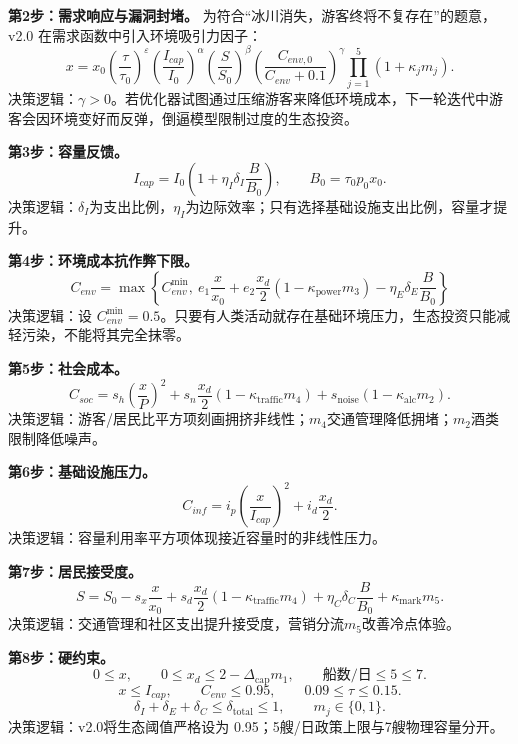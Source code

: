 \documentclass[UTF8,a4paper,12pt]{ctexart}
\begin{document}
\textbf{第2步：需求响应与漏洞封堵。} 为符合“冰川消失，游客终将不复存在”的题意，v2.0 在需求函数中引入环境吸引力因子：
\begin{equation}\tag{M1-2'}
x=x_0\left(\frac{\tau}{\tau_0}\right)^\varepsilon
\left(\frac{I_{cap}}{I_0}\right)^\alpha
\left(\frac{S}{S_0}\right)^\beta
\left(\frac{C_{env,0}}{C_{env} + 0.1}\right)^\gamma
\prod_{j=1}^{5}(1+\kappa_jm_j).
\end{equation}
决策逻辑：\(\gamma>0\)。若优化器试图通过压缩游客来降低环境成本，下一轮迭代中游客会因环境变好而反弹，倒逼模型限制过度的生态投资。

\textbf{第3步：容量反馈。}
\begin{equation}\tag{M1-3}
I_{cap}=I_0\left(1+\eta_I\delta_I\frac{B}{B_0}\right),\qquad B_0=\tau_0p_0x_0.
\end{equation}
决策逻辑：\(\delta_I\)为支出比例，\(\eta_I\)为边际效率；只有选择基础设施支出比例，容量才提升。

\textbf{第4步：环境成本抗作弊下限。}
\begin{equation}\tag{M1-4'}
C_{env} = \max \left\{ C_{env}^{\min}, \ e_1\frac{x}{x_0} + e_2\frac{x_d}{2}(1-\kappa_{\mathrm{power}}m_3) - \eta_E\delta_E\frac{B}{B_0} \right\}
\end{equation}
决策逻辑：设 \(C_{env}^{\min} = 0.5\)。只要有人类活动就存在基础环境压力，生态投资只能减轻污染，不能将其完全抹零。

\textbf{第5步：社会成本。}
\begin{equation}\tag{M1-5}
C_{soc}=s_h\left(\frac{x}{P}\right)^2
+s_n\frac{x_d}{2}(1-\kappa_{\mathrm{traffic}}m_4)
+s_{\mathrm{noise}}(1-\kappa_{\mathrm{alc}}m_2).
\end{equation}
决策逻辑：游客/居民比平方项刻画拥挤非线性；\(m_4\)交通管理降低拥堵；\(m_2\)酒类限制降低噪声。

\textbf{第6步：基础设施压力。}
\begin{equation}\tag{M1-6}
C_{inf}=i_p\left(\frac{x}{I_{cap}}\right)^2+i_d\frac{x_d}{2}.
\end{equation}
决策逻辑：容量利用率平方项体现接近容量时的非线性压力。

\textbf{第7步：居民接受度。}
\begin{equation}\tag{M1-7}
S=S_0-s_x\frac{x}{x_0}
+s_d\frac{x_d}{2}(1-\kappa_{\mathrm{traffic}}m_4)
+\eta_C\delta_C\frac{B}{B_0}
+\kappa_{\mathrm{mark}}m_5.
\end{equation}
决策逻辑：交通管理和社区支出提升接受度，营销分流\(m_5\)改善冷点体验。

\textbf{第8步：硬约束。}
\begin{equation}\tag{M1-8}
0\le x,\qquad 0\le x_d\le 2-\Delta_{\mathrm{cap}}m_1,\qquad \text{船数/日}\le 5\le 7.
\end{equation}
\begin{equation}\tag{M1-9}
x\le I_{cap},\qquad C_{env}\le 0.95,\qquad 0.09\le\tau\le0.15.
\end{equation}
\begin{equation}\tag{M1-10}
\delta_I+\delta_E+\delta_C\le\delta_{\mathrm{total}}\le1,\qquad m_j\in\{0,1\}.
\end{equation}
决策逻辑：v2.0将生态阈值严格设为 0.95；5艘/日政策上限与7艘物理容量分开。
\end{document}
